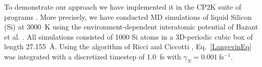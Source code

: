 To demonstrate our approach we have implemented it in the CP2K suite of programs \cite{cp2k}. More precisely, we have conducted MD simulations of liquid Silicon (Si) at 3000~K using the environment-dependent interatomic potential of Bazant et al. \cite{EIP1,EIP2}. 
All simulations consisted of 1000 Si atoms in a 3D-periodic cubic box of length 27.155~\AA. Using the algorithm of Ricci and Ciccotti \cite{Ricci}, Eq.~\ref{LangevinEq} was integrated with a discretized timestep of 1.0~fs with $\gamma_N = 0.001~$fs$^{-1}$.

